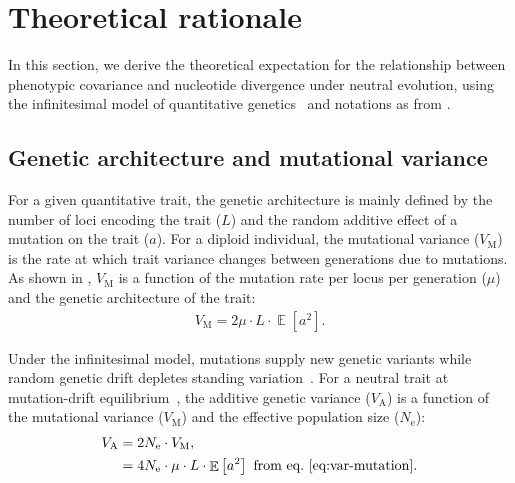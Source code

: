 \documentclass{article}
\newcommand{\Multiply}{\cdot}
\DeclareMathOperator{\E}{\mathbb{E}}
\newcommand{\Ne}{N_{\text{e}}}
\newcommand{\MutationRatePheno}{\mu}
\newcommand{\NbrLoci}{L}
\newcommand{\VarGenetic}{V_{\mathrm{A}}}
\newcommand{\VarMutation}{V_{\mathrm{M}}}
\newcommand{\GenArchi}{\NbrLoci \Multiply \E \left[ a^2 \right]}
\renewcommand{\baselinestretch}{1.3}
\begin{document}
\renewcommand{\baselinestretch}{1.0}\normalsize
\tableofcontents
\renewcommand{\baselinestretch}{1.2}\normalsize

\newpage

\section{Theoretical rationale}\label{sec:theoretical-rationale}

In this section, we derive the theoretical expectation for the relationship between phenotypic covariance and nucleotide divergence under neutral evolution, using the infinitesimal model of quantitative genetics~\citep{lande_quantitative_1979, lande_sexual_1980} and notations as from \citet{latrille_detecting_2024}.

\subsection{Genetic architecture and mutational variance}

For a given quantitative trait, the genetic architecture is mainly defined by the number of loci encoding the trait ($\NbrLoci$) and the random additive effect of a mutation on the trait ($a$).
For a diploid individual, the mutational variance ($\VarMutation$) is the rate at which trait variance changes between generations due to mutations.
As shown in \citet{lande_quantitative_1979, lande_sexual_1980}, $\VarMutation$ is a function of the mutation rate per locus per generation ($\MutationRatePheno$) and the genetic architecture of the trait:
\begin{align}
    \VarMutation = 2 \MutationRatePheno \Multiply \GenArchi \label{eq:var-mutation}.
\end{align}

Under the infinitesimal model, mutations supply new genetic variants while random genetic drift depletes standing variation~\citep{turelli_commentary_2017, barton_infinitesimal_2017, sella_thinking_2019}.
For a neutral trait at mutation-drift equilibrium~\citep{lynch_mutation_1998}, the additive genetic variance ($\VarGenetic$) is a function of the mutational variance ($\VarMutation$) and the effective population size ($\Ne$):
\begin{align}
    \VarGenetic & = 2 \Ne \Multiply \VarMutation, \\
    & = 4 \Ne \Multiply \MutationRatePheno \Multiply \GenArchi \text{ from eq.~\ref{eq:var-mutation}}. \label{eq:var-genetic}
\end{align}
\end{document}

